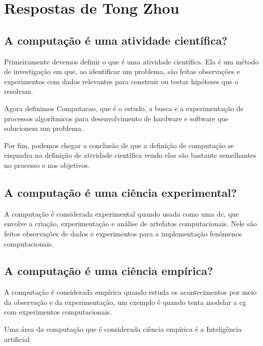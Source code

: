 \section{Respostas de Tong Zhou}

\subsection{A computação é uma atividade científica?}

Primeiramente devemos definir o que é uma atividade científica. Ela é um método de investigação em que, ao identificar um problema, são feitas observações e experimentos com dados relevantes para construir ou testar hipóteses que o resolvam.

Agora definimos \gls{Computacao}, que é o estudo, a busca e a experimentação de processos algorítmicos para desenvolvimento de hardware e software que solucionem um problema. 
   
Por fim, podemos chegar a conclusão de que a definição de computação se enquadra na definição de atividade científica vendo elas são bastante semelhantes no processo e nos objetivos. 

\subsection{A computação é uma ciência experimental?}

A computação é considerada experimental quando usada como uma \gls{dc}, que envolve a criação, experimentação e análise de artefatos computacionais. Nele são feitos observações de dados e  experimentos para a implementação fenômenos computacionais.


\subsection{A computação é uma ciência empírica?}

A computação é considerada empírica quando estuda os acontecimentos por meio da observação e da experimentação, um exemplo é quando tenta modelar a \gls{cg} com experimentos computacionais. 

Uma área da computação que é considerada ciência empírica é a Inteligência artificial
